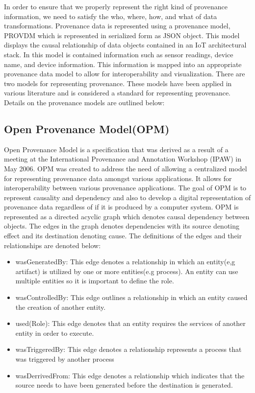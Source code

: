 In order to ensure that we properly represent the right kind of provenance information, we need to satisfy the who, where, how, and what of data transformations. Provenance data is represented using a provenance model, PROV\-DM which is represented in serialized form as JSON object. This model displays the causal relationship of data objects contained in an IoT architectural stack. In this model is contained information such as sensor readings, device name, and device information. This information is mapped into an appropriate provenance data model to allow for interoperability and visualization. There are two models for representing provenance. These models \cite{prov_dm} have been applied in various literature and is considered a standard for representing provenance. Details on the provenance models are outlined below:

\subsection{Open Provenance Model(OPM)}

Open Provenance Model \cite{moreau_open_2011} is a specification that was derived as a result of a meeting at the International Provenance and Annotation Workshop (IPAW) in May 2006. OPM was created to address the need of allowing a centralized model for representing provenance data amongst various applications. It allows for interoperability between various provenance applications. The goal of OPM is to represent causality and dependency and also to develop a digital representation of provenance data regardless of if it is produced by a computer system. OPM is represented as a directed acyclic graph which denotes causal dependency between objects. The edges in the graph denotes dependencies with its source denoting effect and its destination denoting cause. The definitions of the edges and their relationships are denoted below: 

\begin{itemize}
\item wasGeneratedBy: This edge denotes a  relationship in which an entity(e,g artifact) is utilized by one or  more entities(e.g process). An entity can use multiple entities so it is important to define the role.  
\item wasControlledBy: This edge outlines a relationship in which an entity caused the creation of another entity.
\item used(Role): This edge denotes that an entity requires the services of another entity in order to execute.
\item wasTriggeredBy: This edge denotes a relationship represents a process that was triggered by another process
\item wasDerrivedFrom: This edge denotes a relationship which indicates that the source needs to have been generated before the destination is generated.
\end{itemize}

